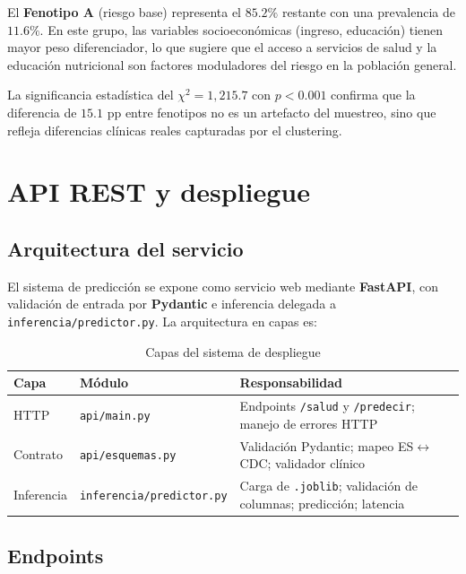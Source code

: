 \documentclass[12pt,a4paper]{article}
\begin{document}
El \textbf{Fenotipo A} (riesgo base) representa el $85.2\%$ restante con una prevalencia de $11.6\%$. En este grupo, las variables socioeconómicas (ingreso, educación) tienen mayor peso diferenciador, lo que sugiere que el acceso a servicios de salud y la educación nutricional son factores moduladores del riesgo en la población general.

La significancia estadística del $\chi^2 = 1{,}215.7$ con $p<0.001$ confirma que la diferencia de $15.1$ pp entre fenotipos no es un artefacto del muestreo, sino que refleja diferencias clínicas reales capturadas por el clustering.

\section{API REST y despliegue}

\subsection{Arquitectura del servicio}

El sistema de predicción se expone como servicio web mediante \textbf{FastAPI}, con validación de entrada por \textbf{Pydantic} e inferencia delegada a \texttt{inferencia/predictor.py}. La arquitectura en capas es:

\begin{table}[H]
  \centering
  \caption{Capas del sistema de despliegue}
  \begin{tabularx}{\linewidth}{llX}
    \toprule
    \textbf{Capa} & \textbf{Módulo} & \textbf{Responsabilidad}\\
    \midrule
    HTTP & \texttt{api/main.py} & Endpoints \texttt{/salud} y \texttt{/predecir}; manejo de errores HTTP\\
    Contrato & \texttt{api/esquemas.py} & Validación Pydantic; mapeo ES$\leftrightarrow$CDC; validador clínico\\
    Inferencia & \texttt{inferencia/predictor.py} & Carga de \texttt{.joblib}; validación de columnas; predicción; latencia\\
    \bottomrule
  \end{tabularx}
\end{table}

\subsection{Endpoints}
\end{document}
